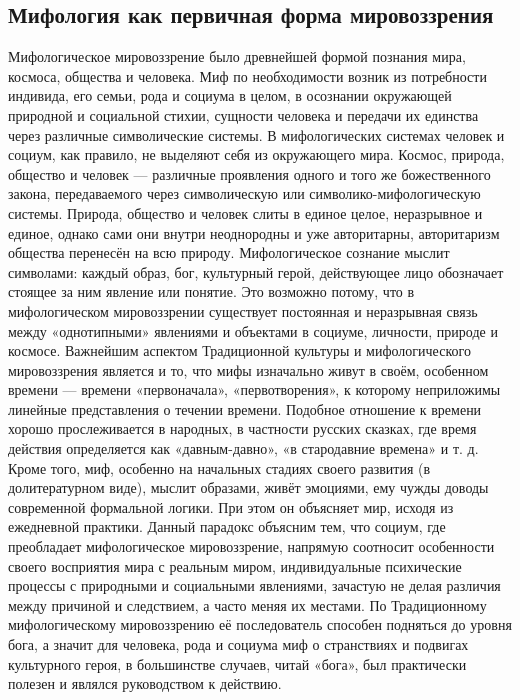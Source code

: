 \documentclass[12pt]{article}
\begin{document}
\subsection{Мифология как первичная форма мировоззрения}
Мифологическое мировоззрение было древнейшей формой познания мира, космоса, общества и человека. Миф
по необходимости возник из потребности индивида, его семьи, рода и социума в целом, в осознании
окружающей природной и социальной стихии, сущности человека и передачи их единства через различные
символические системы. В мифологических системах человек и социум, как правило, не выделяют себя из
окружающего мира. Космос, природа, общество и человек — различные проявления одного и того же
божественного закона, передаваемого через символическую или символико-мифологическую системы.
Природа, общество и человек слиты в единое целое, неразрывное и единое, однако сами они внутри
неоднородны и уже авторитарны, авторитаризм общества перенесён на всю природу.
Мифологическое сознание мыслит символами: каждый образ, бог, культурный герой, действующее лицо
обозначает стоящее за ним явление или понятие. Это возможно потому, что в мифологическом мировоззрении
существует постоянная и неразрывная связь между «однотипными» явлениями и объектами в социуме,
личности, природе и космосе.
Важнейшим аспектом Традиционной культуры и мифологического мировоззрения является и то, что мифы
изначально живут в своём, особенном времени — времени «первоначала», «первотворения», к которому
неприложимы линейные представления о течении времени. Подобное отношение к времени хорошо
прослеживается в народных, в частности русских сказках, где время действия определяется как «давным-давно», «в стародавние времена» и т. д.
Кроме того, миф, особенно на начальных стадиях своего развития (в долитературном виде), мыслит образами,
живёт эмоциями, ему чужды доводы современной формальной логики. При этом он объясняет мир, исходя из
ежедневной практики. Данный парадокс объясним тем, что социум, где преобладает мифологическое
мировоззрение, напрямую соотносит особенности своего восприятия мира с реальным миром, индивидуальные
психические процессы с природными и социальными явлениями, зачастую не делая различия между причиной
и следствием, а часто меняя их местами.
По Традиционному мифологическому мировоззрению её последователь способен подняться до уровня бога, а
значит для человека, рода и социума миф о странствиях и подвигах культурного героя, в большинстве случаев,
читай «бога», был практически полезен и являлся руководством к действию.
\end{document}
